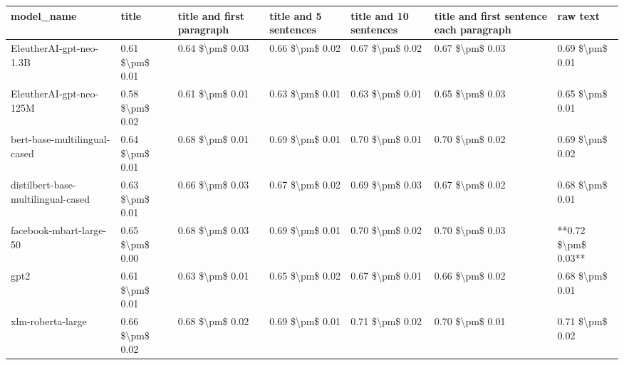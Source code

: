 \begin{tabular}{lllllll}
\toprule
                        model\_name &           title & title and first paragraph & title and 5 sentences & title and 10 sentences & title and first sentence each paragraph &            raw text \\
\midrule
           EleutherAI-gpt-neo-1.3B & 0.61 \$\textbackslash pm\$ 0.01 &           0.64 \$\textbackslash pm\$ 0.03 &       0.66 \$\textbackslash pm\$ 0.02 &        0.67 \$\textbackslash pm\$ 0.02 &                         0.67 \$\textbackslash pm\$ 0.03 &     0.69 \$\textbackslash pm\$ 0.01 \\
           EleutherAI-gpt-neo-125M & 0.58 \$\textbackslash pm\$ 0.02 &           0.61 \$\textbackslash pm\$ 0.01 &       0.63 \$\textbackslash pm\$ 0.01 &        0.63 \$\textbackslash pm\$ 0.01 &                         0.65 \$\textbackslash pm\$ 0.03 &     0.65 \$\textbackslash pm\$ 0.01 \\
      bert-base-multilingual-cased & 0.64 \$\textbackslash pm\$ 0.01 &           0.68 \$\textbackslash pm\$ 0.01 &       0.69 \$\textbackslash pm\$ 0.01 &        0.70 \$\textbackslash pm\$ 0.01 &                         0.70 \$\textbackslash pm\$ 0.02 &     0.69 \$\textbackslash pm\$ 0.02 \\
distilbert-base-multilingual-cased & 0.63 \$\textbackslash pm\$ 0.01 &           0.66 \$\textbackslash pm\$ 0.03 &       0.67 \$\textbackslash pm\$ 0.02 &        0.69 \$\textbackslash pm\$ 0.03 &                         0.67 \$\textbackslash pm\$ 0.02 &     0.68 \$\textbackslash pm\$ 0.01 \\
           facebook-mbart-large-50 & 0.65 \$\textbackslash pm\$ 0.00 &           0.68 \$\textbackslash pm\$ 0.03 &       0.69 \$\textbackslash pm\$ 0.01 &        0.70 \$\textbackslash pm\$ 0.02 &                         0.70 \$\textbackslash pm\$ 0.03 & **0.72 \$\textbackslash pm\$ 0.03** \\
                              gpt2 & 0.61 \$\textbackslash pm\$ 0.01 &           0.63 \$\textbackslash pm\$ 0.01 &       0.65 \$\textbackslash pm\$ 0.02 &        0.67 \$\textbackslash pm\$ 0.01 &                         0.66 \$\textbackslash pm\$ 0.02 &     0.68 \$\textbackslash pm\$ 0.01 \\
                 xlm-roberta-large & 0.66 \$\textbackslash pm\$ 0.02 &           0.68 \$\textbackslash pm\$ 0.02 &       0.69 \$\textbackslash pm\$ 0.01 &        0.71 \$\textbackslash pm\$ 0.02 &                         0.70 \$\textbackslash pm\$ 0.01 &     0.71 \$\textbackslash pm\$ 0.02 \\
\bottomrule
\end{tabular}
